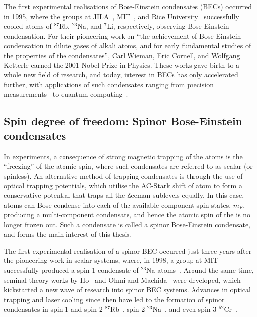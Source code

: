The first experimental realisations of Bose-Einstein condensates (BECs) occurred
in 1995, where the groups at JILA~\cite{Anderson1995}, MIT~\cite{Davis1995}, and
Rice University~\cite{Bradley1995} successfully cooled atoms of \(^{87}\)Rb,
\(^{23}\)Na, and \(^{7}\)Li, respectively, observing Bose-Einstein condensation.
For their pioneering work on ``the achievement of Bose-Einstein condensation in
dilute gases of alkali atoms, and for early fundamental studies of the
properties of the condensates'', Carl Wieman, Eric Cornell, and Wolfgang
Ketterle earned the 2001 Nobel Prize in Physics.
These works gave birth to a whole new field of research, and today, interest in
BECs has only accelerated further, with applications of such condensates ranging
from precision measurements~\cite{Obrecht2007} to quantum
computing~\cite{Byrnes2012}.

\subsection{Spin degree of freedom: Spinor Bose-Einstein condensates}
In experiments, a consequence of strong magnetic trapping of the atoms is the
``freezing'' of the atomic spin, where such condensates are referred to as
scalar (or spinless).
An alternative method of trapping condensates is through the use of optical
trapping potentials, which utilise the AC-Stark shift of atom to form a
conservative potential that traps all the Zeeman sublevels equally.
In this case, atoms can Bose-condense into each of the available component spin
states, \(m_F\), producing a multi-component condensate, and hence the atomic
spin of the is no longer frozen out.
Such a condensate is called a spinor Bose-Einstein condensate, and forms the
main interest of this thesis.

The first experimental realisation of a spinor BEC occurred just three years
after the pioneering work in scalar systems, where, in 1998, a group at MIT
successfully produced a spin-1 condensate of \({^{23}}\)Na
atoms~\cite{Stamper-Kurn1998}.
Around the same time, seminal theory works by Ho~\cite{Ho1998} and Ohmi and
Machida~\cite{Ohmi1998} were developed, which kickstarted a new wave of research
into spinor BEC systems.
Advances in optical trapping and laser cooling since then have led to the
formation of spinor condensates in spin-1 and spin-2
\(^{87}\)Rb~\cite{Barrett2001, Schmaljohann2004},
spin-2 \(^{23}\)Na~\cite{Gorlitz2003}, and
even spin-3 \(^{52}\)Cr~\cite{Beaufils2008}.


